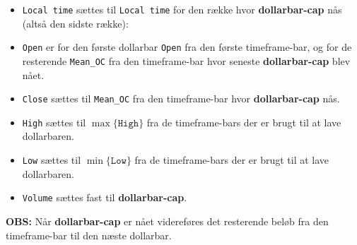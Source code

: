 \documentclass[a4paper,danish,12pt]{article}
\begin{document}
\begin{itemize}
\item \texttt{Local time} sættes til \texttt{Local time} for den række hvor \textbf{dollarbar-cap} nås (altså den sidste række):
\item \texttt{Open} er for den første dollarbar \texttt{Open} fra den første timeframe-bar, og for de resterende \texttt{Mean\_OC} fra den timeframe-bar hvor seneste \textbf{dollarbar-cap} blev nået.
\item \texttt{Close} sættes til \texttt{Mean\_OC} fra den timeframe-bar hvor \textbf{dollarbar-cap} nås.
\item \texttt{High} sættes til $\max\{ \texttt{High} \}$ fra de timeframe-bars der er brugt til at lave dollarbaren.
\item \texttt{Low} sættes til $\min\{ \texttt{Low} \}$ fra de timeframe-bars der er brugt til at lave dollarbaren.
\item \texttt{Volume} sættes fast til \textbf{dollarbar-cap}.
\end{itemize}
\textbf{OBS:} Når \textbf{dollarbar-cap} er nået videreføres det resterende beløb fra den timeframe-bar til den næste dollarbar.
\end{document}
